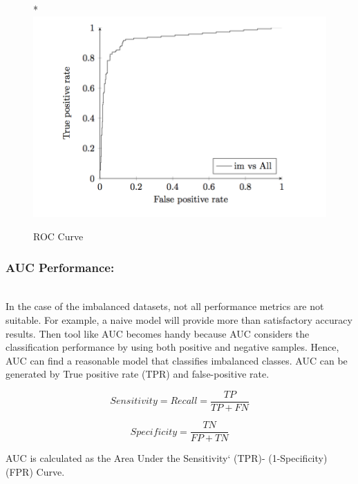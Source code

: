 \begin{figure}[H]*
    \centering
    \includegraphics[width=\linewidth]{figures/roc.png}
    \caption{ROC Curve}
    \label{fig:roc}
\end{figure}


\subsubsection{AUC Performance:}\hspace*{\fill} \\
In the case of the imbalanced datasets, not all performance metrics are not suitable. For example, a naive model will provide more than satisfactory accuracy results. Then tool like AUC becomes handy because AUC considers the classification performance by using both positive and negative samples. Hence, AUC can find a reasonable model that classifies imbalanced classes. AUC can be generated by True positive rate (TPR) and false-positive rate. 

\begin{equation} \label{eq:Sensitivity}
    Sensitivity = Recall = \frac{TP}{TP+FN}
\end{equation}

\begin{equation} \label{eq: Specificity}
    Specificity = \frac{TN}{FP+TN}
\end{equation}

AUC is calculated as the Area Under the {Sensitivity` (TPR)- (1-Specificity)(FPR)} Curve.
